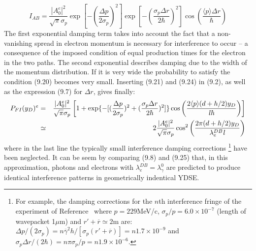 \documentclass [12pt]{article}
\begin{document}
{   \begin{equation} 
 I_{AB} =\frac{|A_0^e|^2}{\sqrt{\pi} \sigma_p}\exp[-(\frac{\Delta p}{2 \sigma_p})^2] \exp[-(\frac{\sigma_p \Delta r}{2 \hbar})^2]
  \cos\left(\frac{\langle p \rangle  \Delta r}{ \hbar}\right)
   \end{equation}
   The first exponential damping term takes into account the fact that a non-vanishing spread in electron
   momentum is necessary for interference to occur -- a consequence of the imposed condition of equal production
   times for the electron in the two paths. The second exponential describes damping due to the width of the
    momentum distribution. If it is very wide the probability to satisfy the condition (9.20) becomes very small.
    Inserting (9.21) and (9.24) in (9.2), as well as the expression (9.7) for $\Delta r$, gives finally:
   \begin{eqnarray}
      P_{FI}(y_D)^e & = & \frac{|A_0^e|^2}{\sqrt{\pi} \sigma_p}\left[1+ \exp\{-[(\frac{\Delta p}{2 \sigma_p} )^2+
(\frac{\sigma_p \Delta r}{2  \hbar })^2]\} \cos \left(\frac{2 \langle p \rangle (d+h/2)y_D}{{\it l} \hbar}\right)\right]
  \nonumber \\
    & \simeq & 2 \frac{|A_0^e|^2}{\sqrt{\pi} \sigma_p} \cos^2\left(\frac{2 \pi(d+h/2) y_D}{\lambda_e^{DB} {\it l}}\right)
  \end{eqnarray}
     where in the last line the typically small interference damping corrections
     \footnote{For example, the damping corrections for the $n$th interference fringe of the experiment
    of Reference~\cite{TEMK} where $ p = 229$MeV/c, $\sigma_p/p = 6.0 \times 10^{-7}$ (length of wavepacket 1$\mu$m) and
    $r'+\overline{r} \simeq 2$m are: $\Delta p/(2 \sigma_p) = n \overline{\gamma}^2 h/[\sigma_p(r'+\overline{r})] =
     n 1.7 \times 10^{-9}$ and $\sigma_p \Delta r/(2 \hbar) = n \pi \sigma_p/p = n 1.9 \times 10^{-6}$.} have been neglected.
   It can be seem by comparing (9.8) and (9.25) that, in this approximation, photons and electrons with
    $\lambda_e^{DB} = \lambda_{\gamma}^0$ are predicted
    to  produce identical interference patterns in geometrically indentical YDSE.

}
\end{document}
